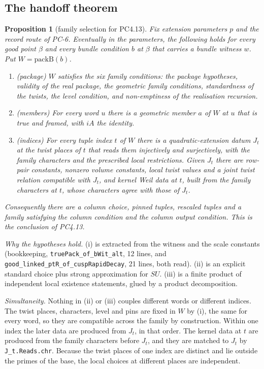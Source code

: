 \documentclass[11pt]{article}
\newcommand{\lean}[1]{\nolinkurl{#1}}
\newcommand{\PC}[1]{PC-#1}
\newtheorem{proposition}{Proposition}
\theoremstyle{remark}
\begin{document}
\subsection{The handoff theorem}

\begin{proposition}[family selection for PC4.13]\label{prop:B}
Fix extension parameters $p$ and the record route of \PC{6}. Eventually in the parameters, the following holds for every good point $\beta$ and every bundle condition $b$ at $\beta$ that carries a bundle witness $w$. Put $W=\mathrm{packB}(b)$.
\begin{enumerate}[label=(\roman*)]
\item (package) $W$ satisfies the six family conditions: the package hypotheses, validity of the real package, the geometric family conditions, standardness of the twists, the level condition, and non-emptiness of the realisation recursion.
\item (members) For every word $u$ there is a geometric member $a$ of $W$ at $u$ that is true and framed, with $iA$ the identity.
\item (indices) For every tuple index $t$ of $W$ there is a quadratic-extension datum $J_t$ at the twist places of $t$ that reads them injectively and surjectively, with the family characters and the prescribed local restrictions. Given $J_t$ there are row-pair constants, nonzero volume constants, local twist values and a joint twist relation compatible with $J_t$, and kernel Weil data at $t$, built from the family characters at $t$, whose characters agree with those of $J_t$.
\end{enumerate}
Consequently there are a column choice, pinned tuples, rescaled tuples and a family satisfying the column condition and the column output condition. This is the conclusion of PC4.13.
\end{proposition}

\emph{Why the hypotheses hold.} (i) is extracted from the witness and the scale constants (bookkeeping, \lean{truePack_of_bWit_alt}, 12 lines, and \lean{good_linked_ptR_of_cuspRapidDecay}, 21 lines, both read). (ii) is an explicit standard choice plus strong approximation for $SU$. (iii) is a finite product of independent local existence statements, glued by a product decomposition.

\emph{Simultaneity.} Nothing in (ii) or (iii) couples different words or different indices. The twist places, characters, level and pins are fixed in $W$ by (i), the same for every word, so they are compatible across the family by construction. Within one index the later data are produced from $J_t$, in that order. The kernel data at $t$ are produced from the family characters before $J_t$, and they are matched to $J_t$ by \lean{J_t.Reads.chr}. Because the twist places of one index are distinct and lie outside the primes of the base, the local choices at different places are independent.
\end{document}
